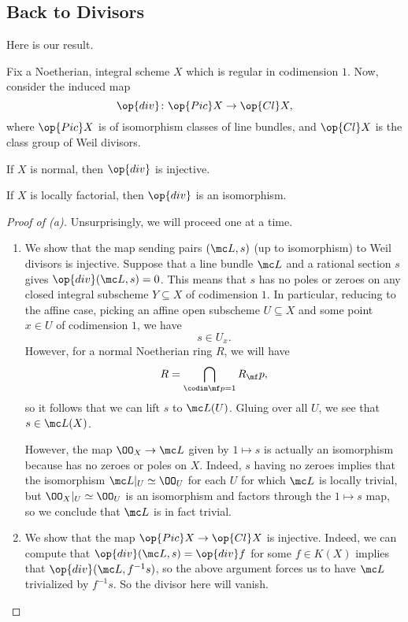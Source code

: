 \documentclass[../notes.tex]{subfiles}
\begin{document}
\subsection{Back to Divisors}
Here is our result.
\begin{theorem} \label{thm:div-is-iso}
	Fix a Noetherian, integral scheme $X$ which is regular in codimension $1$. Now, consider the induced map
	\[\op{div}\colon\op{Pic}X\to\op{Cl}X,\]
	where $\op{Pic}X$ is of isomorphism classes of line bundles, and $\op{Cl}X$ is the class group of Weil divisors.
	\begin{listalph}
		\item If $X$ is normal, then $\op{div}$ is injective.
		\item If $X$ is locally factorial, then $\op{div}$ is an isomorphism.
	\end{listalph}
\end{theorem}
\begin{proof}[Proof of (a)]
	Unsurprisingly, we will proceed one at a time.
	\begin{enumerate}
		\item We show that the map sending pairs $(\mc L,s)$ (up to isomorphism) to Weil divisors is injective. Suppose that a line bundle $\mc L$ and a rational section $s$ gives $\op{div}(\mc L,s)=0$. This means that $s$ has no poles or zeroes on any closed integral subscheme $Y\subseteq X$ of codimension $1$. In particular, reducing to the affine case, picking an affine open subscheme $U\subseteq X$ and some point $x\in U$ of codimension $1$, we have
		\[s\in U_x.\]
		However, for a normal Noetherian ring $R$, we will have
		\[R=\bigcap_{\codim\mf p=1}R_\mf p,\]
		so it follows that we can lift $s$ to $\mc L(U)$. Gluing over all $U$, we see that $s\in\mc L(X)$.

		However, the map $\OO_X\to\mc L$ given by $1\mapsto s$ is actually an isomorphism because has no zeroes or poles on $X$. Indeed, $s$ having no zeroes implies that the isomorphism $\mc L|_U\simeq\OO_U$ for each $U$ for which $\mc L$ is locally trivial, but $\OO_X|_U\simeq\OO_U$ is an isomorphism and factors through the $1\mapsto s$ map, so we conclude that $\mc L$ is in fact trivial.

		\item We show that the map $\op{Pic}X\to\op{Cl}X$ is injective. Indeed, we can compute that $\op{div}(\mc L,s)=\op{div}f$ for some $f\in K(X)$ implies that $\op{div}(\mc L,f^{-1}s)$, so the above argument forces us to have $\mc L$ trivialized by $f^{-1}s$. So the divisor here will vanish.
		\qedhere
	\end{enumerate}
\end{proof}
\end{document}
